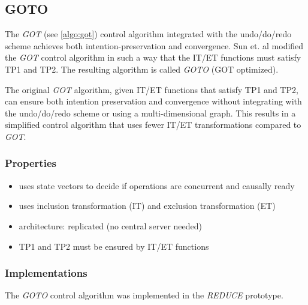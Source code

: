 \subsection{GOTO}
\label{algo:goto}

The \emph{GOT} (see \ref{algo:got}) control algorithm integrated with the undo/do/redo scheme achieves both intention-preservation and convergence. Sun et. al \cite{sun98b} modified the \emph{GOT} control algorithm in such a way that the IT/ET functions must satisfy TP1 and TP2. The resulting algorithm is called \emph{GOTO} (GOT optimized).

The original \emph{GOT} algorithm, given IT/ET functions that satisfy TP1 and TP2, can ensure both intention preservation and convergence without integrating with the undo/do/redo scheme or using a multi-dimensional graph. This results in a simplified control algorithm that uses fewer IT/ET transformations compared to \emph{GOT}.


\subsubsection{Properties}
\begin{itemize}
 \item uses state vectors to decide if operations are concurrent and 
       causally ready
 \item uses inclusion transformation (IT) and exclusion transformation (ET)
 \item architecture: replicated (no central server needed)
 \item TP1 and TP2 must be ensured by IT/ET functions
\end{itemize}


\subsubsection{Implementations}
The \emph{GOTO} control algorithm was implemented in the \emph{REDUCE} prototype. 
